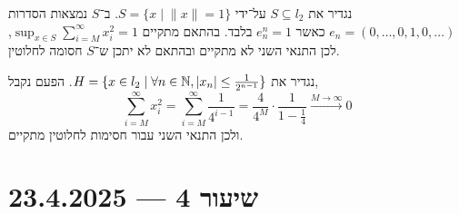 \begin{example}
	נגדיר את $S \subseteq l_2$ על־ידי $S = \{ x \mid \lVert x \rVert = 1 \}$.
	ב־$S$ נמצאות הסדרות $e_n = (0, \ldots, 0, 1, 0, \ldots)$ כאשר $e_n^n = 1$ בלבד.
	בהתאם מתקיים $\sup_{x \in S} \sum_{i = M}^\infty x_i^2 = 1$, לכן התנאי השני לא מתקיים ובהתאם לא יתכן ש־$S$ חסומה לחלוטין.
\end{example}
\begin{example}
	נגדיר את $H = \{ x \in l_2 \mid \forall n \in \mathbb{N}, |x_n| \le \frac{1}{2^{n - 1}} \}$.
	הפעם נקבל,
	\[
		\sum_{i = M}^\infty x_i^2
		= \sum_{i = M}^\infty \frac{1}{4^{i - 1}}
		= \frac{4}{4^M} \cdot \frac{1}{1 - \frac{1}{4}}
		\xrightarrow{M \to \infty} 0
	\]
	ולכן התנאי השני עבור חסימות לחלוטין מתקיים.
\end{example}

\section{ שיעור 4 --- 23.4.2025}
